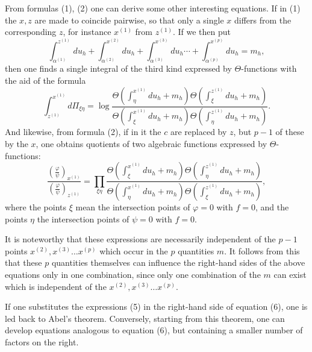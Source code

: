 \documentclass[10pt]{article}
\begin{document}
From formulas (1), (2) one can derive some other interesting equations. If in (1) the \(x,z\) are made to coincide pairwise, so that only a single \(x\) differs from the corresponding \(z\), for instance \(x^{(1)}\) from \(z^{(1)}\). If we then put
\[
\int_{\alpha^{(1)}}^{z^{(1)}}du_h+\int_{\alpha^{(2)}}^{x^{(2)}}du_h+\int_{\alpha^{(3)}}^{x^{(3)}}du_h\cdots+\int_{\alpha^{(p)}}^{x^{(p)}}du_h=m_h,
\]
then one finds a single integral of the third kind expressed by \(\Theta\)-functions with the aid of the formula
\[
\tag{5}
\int_{z^{(1)}}^{x^{(1)}}d\Pi_{\xi\eta}
=\log\frac{
\Theta\!\left(\int_{\eta}^{x^{(1)}}du_h+m_h\right)
\Theta\!\left(\int_{\xi}^{z^{(1)}}du_h+m_h\right)}
{\Theta\!\left(\int_{\xi}^{x^{(1)}}du_h+m_h\right)
\Theta\!\left(\int_{\eta}^{z^{(1)}}du_h+m_h\right)}.
\]
And likewise, from formula (2), if in it the \(c\) are replaced by \(z\), but \(p-1\) of these by the \(x\), one obtains quotients of two algebraic functions expressed by \(\Theta\)-functions:
\[
\tag{6}
\frac{\left(\frac{\varphi}{\psi}\right)_{x^{(1)}}}
{\left(\frac{\varphi}{\psi}\right)_{z^{(1)}}}
=
\prod_{\xi\eta}
\frac{
\Theta\!\left(\int_{\xi}^{x^{(1)}}du_h+m_h\right)
\Theta\!\left(\int_{\eta}^{z^{(1)}}du_h+m_h\right)}
{\Theta\!\left(\int_{\eta}^{x^{(1)}}du_h+m_h\right)
\Theta\!\left(\int_{\xi}^{z^{(1)}}du_h+m_h\right)},
\]
where the points \(\xi\) mean the intersection points of \(\varphi=0\) with \(f=0\), and the points \(\eta\) the intersection points of \(\psi=0\) with \(f=0\).

It is noteworthy that these expressions are necessarily independent of the \(p-1\) points \(x^{(2)},x^{(3)}\ldots x^{(p)}\) which occur in the \(p\) quantities \(m\). It follows from this that these \(p\) quantities themselves can influence the right-hand sides of the above equations only in one combination, since only one combination of the \(m\) can exist which is independent of the \(x^{(2)},x^{(3)}\ldots x^{(p)}\).

If one substitutes the expressions (5) in the right-hand side of equation (6), one is led back to Abel's theorem. Conversely, starting from this theorem, one can develop equations analogous to equation (6), but containing a smaller number of factors on the right.
\end{document}
